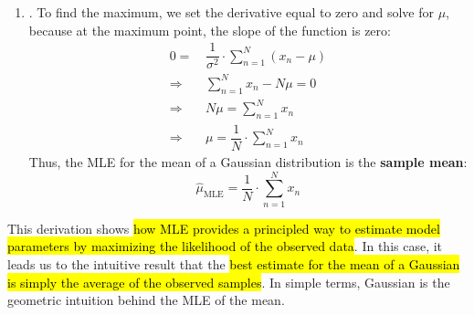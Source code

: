 \begin{enumerate}
    \item {}. To find the maximum, we set the derivative equal to zero and solve for $\mu$, because at the maximum point, the slope of the function is zero:
    \begin{align*}
        0 = & \, \dfrac{1}{\sigma^{2}} \cdot \displaystyle \sum_{n=1}^{N} \left(x_n - \mu\right) \\[.3em]
        \Rightarrow & \, \sum_{n=1}^{N} x_n - N \mu = 0 \\[.3em]
        \Rightarrow & \, N \mu = \sum_{n=1}^{N} x_n \\[.3em]
        \Rightarrow & \, \mu = \dfrac{1}{N} \cdot \sum_{n=1}^{N} x_n
    \end{align*}
    Thus, the MLE for the mean of a Gaussian distribution is the \textbf{sample mean}:
    \begin{equation}
        \hat{\mu}_{\text{MLE}} = \dfrac{1}{N} \cdot \sum_{n=1}^{N} x_n
    \end{equation}
\end{enumerate}
This derivation shows \hl{how MLE provides a principled way to estimate model parameters by maximizing the likelihood of the observed data}. In this case, it leads us to the intuitive result that the \hl{best estimate for the mean of a Gaussian is simply the average of the observed samples}. In simple terms, Gaussian is the geometric intuition behind the MLE of the mean.

